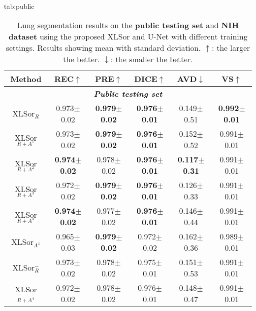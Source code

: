 \documentclass{midl} \usepackage{multirow}
\begin{document}
\begin{table}[t!]\floatconts
  {tab:public}{\caption{Lung segmentation results on the \textbf{public testing set} and \textbf{NIH dataset} using the proposed XLSor and U-Net with different training settings. Results showing mean with standard deviation. $\uparrow$: the larger the better. $\downarrow$: the smaller the better.}
  }{\begin{tabular}{|c|c|c|c|c|c|}
  \hline
  \bfseries Method          & \bfseries REC$\uparrow$          & \bfseries PRE$\uparrow$         & \bfseries DICE$\uparrow$            & \bfseries AVD$\downarrow$         & \bfseries VS$\uparrow$         \\ \hline \hline
  \multicolumn{6}{|c|}{\textit{\textbf{Public testing set}}}             \\ \hline
XLSor$_{R}$        & 0.973$\pm$0.02  & \bfseries 0.979$\pm$0.02  & \bfseries 0.976$\pm$0.01  & 0.149$\pm$0.51  & \bfseries 0.992$\pm$0.01  \\
XLSor$_{R+A^1}$     & 0.973$\pm$0.02  & \bfseries 0.979$\pm$0.02  & \bfseries 0.976$\pm$0.01  & 0.152$\pm$0.52  & 0.991$\pm$0.01  \\ 
XLSor$_{R+A^2}$     & \bfseries 0.974$\pm$0.02  & 0.978$\pm$0.02  & \bfseries 0.976$\pm$0.01  & \bfseries 0.117$\pm$0.31  & 0.991$\pm$0.01  \\
XLSor$_{R+A^3}$     & 0.972$\pm$0.02  & \bfseries 0.979$\pm$0.02  & \bfseries 0.976$\pm$0.01  & 0.126$\pm$0.33  & 0.991$\pm$0.01  \\
XLSor$_{R+A^4}$     & \bfseries 0.974$\pm$0.02  & 0.977$\pm$0.02  & \bfseries 0.976$\pm$0.01  & 0.146$\pm$0.44  & 0.991$\pm$0.01  \\
XLSor$_{A^4}$       & 0.965$\pm$0.03  & \bfseries 0.979$\pm$0.02  & 0.972$\pm$0.02  & 0.162$\pm$0.36  & 0.989$\pm$0.01  \\ \hline
XLSor$_{R}^-$       & 0.973$\pm$0.02  & 0.978$\pm$0.02 & 0.975$\pm$0.01 & 0.151$\pm$0.53 & 0.991$\pm$0.01   \\
XLSor$_{R+A^4}^-$      & 0.972$\pm$0.02  & 0.978$\pm$0.02 & 0.976$\pm$0.01 & 0.148$\pm$0.47 & 0.991$\pm$0.01  \\ \hline


\end{tabular}}
\end{table}
\end{document}
